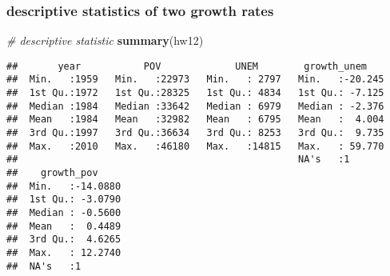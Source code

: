 \documentclass[]{article}
\newenvironment{Shaded}{\begin{snugshade}}{\end{snugshade}}
\newcommand{\KeywordTok}[1]{\textcolor[rgb]{0.13,0.29,0.53}{\textbf{#1}}}
\newcommand{\DataTypeTok}[1]{\textcolor[rgb]{0.13,0.29,0.53}{#1}}
\newcommand{\DecValTok}[1]{\textcolor[rgb]{0.00,0.00,0.81}{#1}}
\newcommand{\StringTok}[1]{\textcolor[rgb]{0.31,0.60,0.02}{#1}}
\newcommand{\CommentTok}[1]{\textcolor[rgb]{0.56,0.35,0.01}{\textit{#1}}}
\newcommand{\ControlFlowTok}[1]{\textcolor[rgb]{0.13,0.29,0.53}{\textbf{#1}}}
\newcommand{\OperatorTok}[1]{\textcolor[rgb]{0.81,0.36,0.00}{\textbf{#1}}}
\newcommand{\NormalTok}[1]{#1}
\begin{document}
\begin{Shaded}
\end{Shaded}

\subsubsection{descriptive statistics of two growth
rates}\label{descriptive-statistics-of-two-growth-rates}

\begin{Shaded}
\begin{Highlighting}[]
\CommentTok{# descriptive statistic}
\KeywordTok{summary}\NormalTok{(hw12)}
\end{Highlighting}
\end{Shaded}

\begin{verbatim}
##       year           POV             UNEM        growth_unem     
##  Min.   :1959   Min.   :22973   Min.   : 2797   Min.   :-20.245  
##  1st Qu.:1972   1st Qu.:28325   1st Qu.: 4834   1st Qu.: -7.125  
##  Median :1984   Median :33642   Median : 6979   Median : -2.376  
##  Mean   :1984   Mean   :32982   Mean   : 6795   Mean   :  4.004  
##  3rd Qu.:1997   3rd Qu.:36634   3rd Qu.: 8253   3rd Qu.:  9.735  
##  Max.   :2010   Max.   :46180   Max.   :14815   Max.   : 59.770  
##                                                 NA's   :1        
##    growth_pov      
##  Min.   :-14.0880  
##  1st Qu.: -3.0790  
##  Median : -0.5600  
##  Mean   :  0.4489  
##  3rd Qu.:  4.6265  
##  Max.   : 12.2740  
##  NA's   :1
\end{verbatim}
\end{document}
